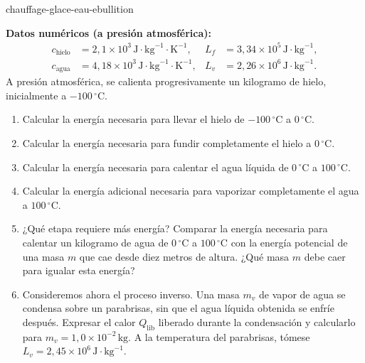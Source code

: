 
\begin{exo}{chauffage-glace-eau-ebullition}

\textbf{Datos numéricos (a presión atmosférica):}
\[
\begin{aligned}
c_{\text{hielo}} &= 2{,}1\times10^3\,\text{J}\!\cdot\!\text{kg}^{-1}\!\cdot\!\text{K}^{-1},
& L_f &= 3{,}34\times10^5\,\text{J}\!\cdot\!\text{kg}^{-1},\\
c_{\text{agua}} &= 4{,}18\times10^3\,\text{J}\!\cdot\!\text{kg}^{-1}\!\cdot\!\text{K}^{-1},
& L_v &= 2{,}26\times10^6\,\text{J}\!\cdot\!\text{kg}^{-1}.
\end{aligned}
\]
A presión atmosférica, se calienta progresivamente un kilogramo de hielo, inicialmente a $-100\,{}^\circ\text{C}$.

\begin{enumerate}
  \item Calcular la energía necesaria para llevar el hielo de $-100\,{}^\circ\text{C}$ a $0\,{}^\circ\text{C}$.
  \item Calcular la energía necesaria para fundir completamente el hielo a $0\,{}^\circ\text{C}$.
  \item Calcular la energía necesaria para calentar el agua líquida de $0\,{}^\circ\text{C}$ a $100\,{}^\circ\text{C}$.
  \item Calcular la energía adicional necesaria para vaporizar completamente el agua a $100\,{}^\circ\text{C}$.
  \item ¿Qué etapa requiere más energía? Comparar la energía necesaria para calentar un kilogramo de agua de $0\,{}^\circ\text{C}$ a $100\,{}^\circ\text{C}$ con la energía potencial de una masa $m$ que cae desde diez metros de altura. ¿Qué masa $m$ debe caer para igualar esta energía?
  \item Consideremos ahora el proceso inverso. Una masa $m_v$ de vapor de agua se condensa sobre un parabrisas, sin que el agua líquida obtenida se enfríe después. Expresar el calor $Q_{\text{lib}}$ liberado durante la condensación y calcularlo para $m_v=1{,}0\times10^{-2}\,\text{kg}$. A la temperatura del parabrisas, tómese $L_v=2{,}45\times10^6\,\text{J}\!\cdot\!\text{kg}^{-1}$.
\end{enumerate}


\end{exo}
